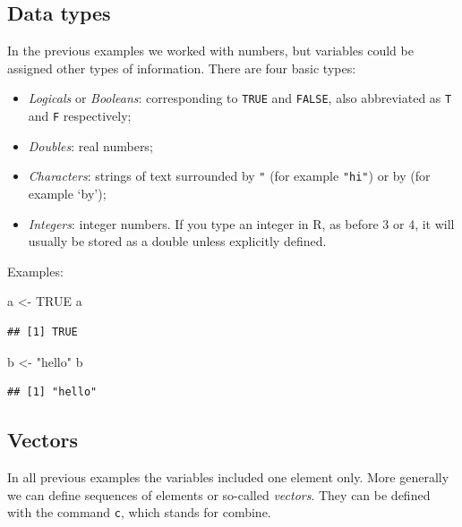 \documentclass[
]{book}
\newenvironment{Shaded}{\begin{snugshade}}{\end{snugshade}}
\newcommand{\ConstantTok}[1]{\textcolor[rgb]{0.00,0.00,0.00}{#1}}
\newcommand{\NormalTok}[1]{#1}
\newcommand{\OtherTok}[1]{\textcolor[rgb]{0.56,0.35,0.01}{#1}}
\newcommand{\StringTok}[1]{\textcolor[rgb]{0.31,0.60,0.02}{#1}}
\begin{document}
\hypertarget{data-types}{%
\subsection{Data types}\label{data-types}}

In the previous examples we worked with numbers, but variables could be assigned other types of information. There are four basic types:

\begin{itemize}
\item
  \emph{Logicals} or \emph{Booleans}: corresponding to \texttt{TRUE} and \texttt{FALSE}, also abbreviated as \texttt{T} and \texttt{F} respectively;
\item
  \emph{Doubles}: real numbers;
\item
  \emph{Characters}: strings of text surrounded by \texttt{"} (for example \texttt{"hi"}) or by \texttt{\textquotesingle{}} (for example `by');
\item
  \emph{Integers}: integer numbers. If you type an integer in R, as before 3 or 4, it will usually be stored as a double unless explicitly defined.
\end{itemize}

Examples:

\begin{Shaded}
\begin{Highlighting}[]
\NormalTok{a }\OtherTok{\textless{}{-}} \ConstantTok{TRUE}
\NormalTok{a}
\end{Highlighting}
\end{Shaded}

\begin{verbatim}
## [1] TRUE
\end{verbatim}

\begin{Shaded}
\begin{Highlighting}[]
\NormalTok{b }\OtherTok{\textless{}{-}} \StringTok{"hello"}
\NormalTok{b}
\end{Highlighting}
\end{Shaded}

\begin{verbatim}
## [1] "hello"
\end{verbatim}

\hypertarget{vectors}{%
\subsection{Vectors}\label{vectors}}

In all previous examples the variables included one element only. More generally we can define sequences of elements or so-called \emph{vectors}. They can be defined with the command \texttt{c}, which stands for combine.
\end{document}
